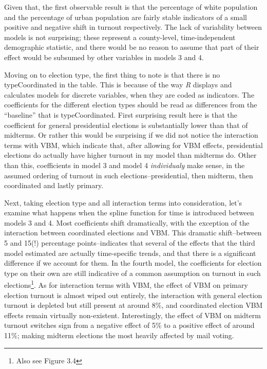 \documentclass[12pt,twoside]{reedthesis}
\begin{document}
  Given that, the first observable result is that the percentage of white
  population and the percentage of urban population are fairly stable
  indicators of a small positive and negative shift in turnout
  respectively. The lack of variability between models is not surprising;
  these represent a county-level, time-independent demographic statistic,
  and there would be no reason to assume that part of their effect would
  be subsumed by other variables in models 3 and 4.
  
  Moving on to election type, the first thing to note is that there is no
  typeCoordinated in the table. This is because of the way \textit{R}
  displays and calculates models for discrete variables, when they are
  coded as indicators. The coefficients for the different election types
  should be read as differences from the ``baseline'' that is
  typeCoordinated. First surprising result here is that the coefficient
  for general presidential elections is substantially lower than that of
  midterms. Or rather this would be surprising if we did not notice the
  interaction terms with VBM, which indicate that, after allowing for VBM
  effects, presidential elections do actually have higher turnout in my
  model than midterms do. Other than this, coefficients in model 3 and
  model 4 \emph{individualy} make sense, in the assumed ordering of
  turnout in such elections--presidential, then midterm, then coordinated
  and lastly primary.
  
  Next, taking election type and all interaction terms into consideration,
  let's examine what happens when the spline function for time is
  introduced between models 3 and 4. Most coefficients shift dramatically,
  with the exception of the interaction between coordinated elections and
  VBM. This dramatic shift--between 5 and 15(!) percentage
  points--indicates that several of the effects that the third model
  estimated are actually time-specific trends, and that there is a
  significant difference if we account for them. In the fourth model, the
  coefficients for election type on their own are still indicative of a
  common assumption on turnout in such elections\footnote{Also see Figure
    3.4}. As for interaction terms with VBM, the effect of VBM on primary
  election turnout is almost wiped out entirely, the interaction with
  general election turnout is depleted but still present at around 8\%,
  and coordinated election VBM effects remain virtually non-existent.
  Interestingly, the effect of VBM on midterm turnout switches sign from a
  negative effect of 5\% to a positive effect of around 11\%; making
  midterm elections the most heavily affected by mail voting.
  
\end{document}
